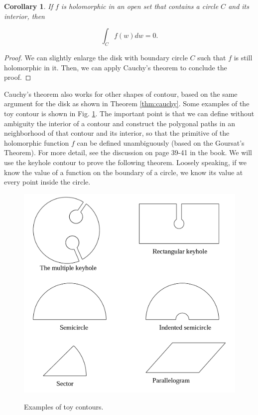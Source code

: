 \documentclass{article}
\newtheorem{corollary}{Corollary}
\begin{document}
\begin{corollary}
If $f$ is holomorphic in an open set that contains a circle $C$ and its interior, then

\begin{equation*}
\int_C f(w)dw=0.
\end{equation*}
\end{corollary}

\begin{proof}
We can slightly enlarge the disk with boundary circle $C$ such that $f$ is still holomorphic in it. Then, we can apply Cauchy's theorem to conclude the proof. 
\end{proof}

Cauchy's theorem also works for other shapes of contour, based on the same argument for the disk as shown in Theorem \ref{thm:cauchy}. Some examples of the toy contour is shown in Fig. \ref{fig:toy_contour}. The important point is that we can define without ambiguity the interior of a contour and construct the polygonal paths in an neighborhood of that contour and its interior, so that the primitive of the holomorphic function $f$ can be defined unambiguously (based on the Goursat's Theorem). For more detail, see the discussion on page 39-41 in the book. We will use the keyhole contour to prove the following theorem. Loosely speaking, if we know the value of a function on the boundary of a circle, we know its value at every point inside the circle.

\begin{figure}
\centering
\includegraphics[scale=0.3]{toy_contour.png} \\
\caption{Examples of toy contours.} 
\label{fig:toy_contour}
\end{figure}
\end{document}
